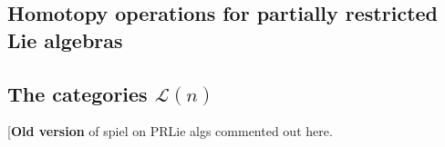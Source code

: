 \documentclass[11pt]{amsart}
\theoremstyle{plain}
\theoremstyle{definition}
\DeclareMathOperator{\im}{im}
\newcommand{\DASH}{\textup{--}}
\renewcommand{\to}{\longrightarrow}
\newcommand{\scrL}{\mathscr{L}}
\newcommand{\calL}{\mathcal{L}}
\newcommand{\calV}{\mathcal{V}}
\theoremstyle{plain}
\newcommand{\LieOperad}{{\scrL}}
\newcommand{\restn}[1]{#1^{[2]}}
\newcommand{\vect}[2]{\calV^{#1}_{#2}}
\begin{document}
\begin{homotopy operations for PRLs}

\section{\textbf{Homotopy operations for partially restricted Lie algebras}}\label{sec on Lie algs and homotopy ops}

\subsection{The categories $\calL(n)$}\label{The categories Ln}
[\textbf{Old version} of spiel on PRLie algs commented out here.%
%
%

\end{homotopy operations for PRLs}
\end{document}
